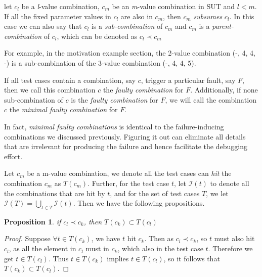 \documentclass{sig-alternate}
\begin{document}
\begin{definition}
let $c_{l}$ be a \emph{l}-value combination, $c_{m}$ be an \emph{m}-value combination in SUT and $l < m$. If all the fixed parameter values in $c_{l}$ are also in $c_{m}$, then $c_{m}$ \emph{subsumes} $c_{l}$. In this case we can also say that $c_{l}$ is a \emph{sub-combination} of $c_{m}$ and $c_{m}$ is a \emph{parent-combination} of $c_{l}$, which can be denoted as $c_{l} \prec  c_{m}$
\end{definition}

For example, in the motivation example section, the 2-value combination (-, 4, 4, -) is a sub-combination of the 3-value combination (-, 4, 4, 5).

\begin{definition}
If all test cases contain a combination, say $c$, trigger a particular fault, say $F$, then we call this combination $c$ the \emph{faulty combination} for $F$. Additionally, if none sub-combination of $c$ is the \emph{faulty combination} for $F$, we will call the combination $c$ the \emph{minimal faulty combination} for $F$.

\end{definition}

In fact, \emph{minimal faulty combinations} is identical to the failure-inducing combinations we discussed previously. Figuring it out can eliminate all details that are irrelevant for producing the failure and hence facilitate the debugging effort.


%

Let $c_{m}$ be a m-value combination, we denote all the test cases can \emph{hit} the combination $c_{m}$ as $T(c_{m})$. Further, for the test case $t$, let $\mathcal{I}(t)$ to denote all the combinations that are hit by $t$, and for the set of test cases $T$, we let $\mathcal{I}(T) = \bigcup_{t\in T} \mathcal{I}(t)$. Then we have the following propositions.


\newtheorem{proposition}{Proposition}
\begin{proposition}
if $c_{l} \prec c_{k}$, then $T(c_{k}) \subset T(c_{l})$
\end{proposition}

\begin{proof}
Suppose $ \forall t \in T(c_{k})$, we have $t$ hit $c_{k}$. Then as $c_{l} \prec c_{k}$, so $t$ must also hit $c_{l}$, as all the element in $c_{l}$ must in $c_{k}$, which also in the test case $t$. Therefore we get $t \in T(c_{l})$. Thus $t \in T(c_{k})$ implies $t \in T(c_{l})$, so it follows that $T(c_{k}) \subset T(c_{l})$.
\end{proof}
\end{document}
